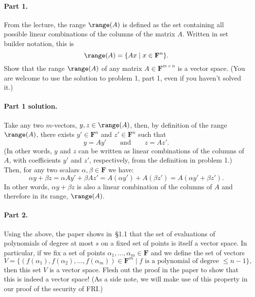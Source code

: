 \documentclass[12pt,hidelinks]{article}
\newcommand{\field}{\mathbf{F}}
\begin{document}
\paragraph{Part 1.} From the lecture, the range $\range(A)$
is defined as the set containing all possible linear combinations of the
columns of the matrix $A$. Written in set builder notation, this is
\[
    \range(A) = \{Ax \mid x \in \field^n\}.
\]
Show that the range $\range(A)$ of any matrix $A \in \field^{m\times n}$ is a
vector space. (You are welcome to use the solution to problem 1, part 1, even
if you haven't solved it.)

\begin{solution}
\paragraph{Part 1 solution.} Take any two $m$-vectors, $y, z \in \range(A)$,
then, by definition of the range $\range(A)$, there exists $y' \in \field^n$
and $z' \in \field^n$ such that
\[
    y = Ay' \qquad \text{and} \qquad z = Az'.
\]
(In other words, $y$ and $z$ can be written as linear combinations of the
columns of $A$, with coefficients $y'$ and $z'$, respectively, from the
definition in problem 1.) Then, for any two scalars $\alpha, \beta \in \field$
we have:
\[
    \alpha y + \beta z = \alpha Ay' + \beta Az' = A(\alpha y') + A(\beta z') = A(\alpha y' + \beta z').
\]
In other words, $\alpha y + \beta z$ is also a linear combination of the
columns of $A$ and therefore in its range, $\range(A)$.
\end{solution}


\paragraph{Part 2.} Using the above, the paper shows in~\S1.1 that the set of
evaluations of polynomials of degree at most $s$ on a fixed set of points is
itself a vector space. In particular, if we fix a set of points $\alpha_1,
\dots, \alpha_m \in \field$ and we define the set of vectors
\begin{equation}\label{eq:rs-mat}
    V = \{(f(\alpha_1), f(\alpha_2), \dots, f(\alpha_m)) \in \field^m \mid \text{$f$ is a polynomial of degree $\le n-1$}\},
\end{equation}
then this set $V$ is a vector space. Flesh out the proof in the paper to show
that this is indeed a vector space! (As a side note, we will make use of this
property in our proof of the security of FRI.)
\end{document}
